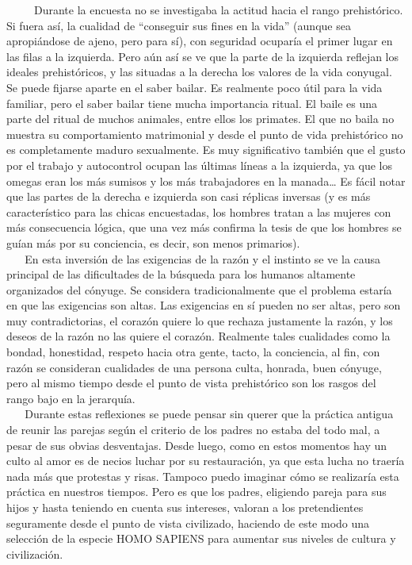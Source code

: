 ~ ~ ~ Durante la encuesta no se investigaba la actitud hacia el rango
prehistórico. Si fuera así, la cualidad de ``conseguir sus fines en la
vida'' (aunque sea apropiándose de ajeno, pero para sí), con seguridad
ocuparía el primer lugar en las filas a la izquierda. Pero aún así se ve
que la parte de la izquierda reflejan los ideales prehistóricos, y las
situadas a la derecha los valores de la vida conyugal. Se puede fijarse
aparte en el saber bailar. Es realmente poco útil para la vida familiar,
pero el saber bailar tiene mucha importancia ritual. El baile es una
parte del ritual de muchos animales, entre ellos los primates. El que no
baila no muestra su comportamiento matrimonial y desde el punto de vida
prehistórico no es completamente maduro sexualmente. Es muy
significativo también que el gusto por el trabajo y autocontrol ocupan
las últimas líneas a la izquierda, ya que los omegas eran los más
sumisos y los más trabajadores en la manada\ldots{} Es fácil notar que
las partes de la derecha e izquierda son casi réplicas inversas (y es
más característico para las chicas encuestadas, los hombres tratan a las
mujeres con más consecuencia lógica, que una vez más confirma la tesis
de que los hombres se guían más por su conciencia, es decir, son menos
primarios).\\
\hspace*{0.333em} ~ ~ En esta inversión de las exigencias de la razón y
el instinto se ve la causa principal de las dificultades de la búsqueda
para los humanos altamente organizados del cónyuge. Se considera
tradicionalmente que el problema estaría en que las exigencias son
altas. Las exigencias en sí pueden no ser altas, pero son muy
contradictorias, el corazón quiere lo que rechaza justamente la razón, y
los deseos de la razón no las quiere el corazón. Realmente tales
cualidades como la bondad, honestidad, respeto hacia otra gente, tacto,
la conciencia, al fin, con razón se consideran cualidades de una persona
culta, honrada, buen cónyuge, pero al mismo tiempo desde el punto de
vista prehistórico son los rasgos del rango bajo en la jerarquía.\\
\hspace*{0.333em} ~ ~ Durante estas reflexiones se puede pensar sin
querer que la práctica antigua de reunir las parejas según el criterio
de los padres no estaba del todo mal, a pesar de sus obvias desventajas.
Desde luego, como en estos momentos hay un culto al amor es de necios
luchar por su restauración, ya que esta lucha no traería nada más que
protestas y risas. Tampoco puedo imaginar cómo se realizaría esta
práctica en nuestros tiempos. Pero es que los padres, eligiendo pareja
para sus hijos y hasta teniendo en cuenta sus intereses, valoran a los
pretendientes seguramente desde el punto de vista civilizado, haciendo
de este modo una selección de la especie HOMO SAPIENS para aumentar sus
niveles de cultura y civilización.

